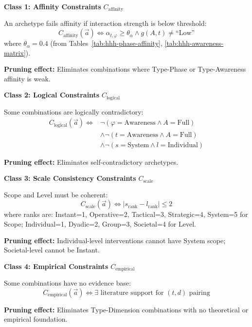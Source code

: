 \begin{tcolorbox}[colback=gray!5!white, colframe=gray!75!black,
    title=Definition HHH-D3: Four Constraint Classes]

\textbf{Class 1: Affinity Constraints} $C_{\text{affinity}}$

An archetype fails affinity if interaction strength is below threshold:
\begin{equation}
C_{\text{affinity}}(\vec{a}) \iff \alpha_{t,\varphi} \geq \theta_\alpha \wedge g(A, t) \neq \text{``Low''}
\end{equation}
where $\theta_\alpha = 0.4$ (from Tables~\ref{tab:hhh-phase-affinity}, \ref{tab:hhh-awareness-matrix}).

\textbf{Pruning effect:} Eliminates combinations where Type-Phase or Type-Awareness affinity is weak.

\medskip
\textbf{Class 2: Logical Constraints} $C_{\text{logical}}$

Some combinations are logically contradictory:
\begin{align}
C_{\text{logical}}(\vec{a}) \iff &\neg(\varphi = \text{Awareness} \wedge A = \text{Full}) \tag{Redundancy} \\
&\wedge \neg(t = \text{Awareness} \wedge A = \text{Full}) \tag{Type-Awareness} \\
&\wedge \neg(s = \text{System} \wedge l = \text{Individual}) \tag{Scale mismatch}
\end{align}

\textbf{Pruning effect:} Eliminates self-contradictory archetypes.

\medskip
\textbf{Class 3: Scale Consistency Constraints} $C_{\text{scale}}$

Scope and Level must be coherent:
\begin{equation}
C_{\text{scale}}(\vec{a}) \iff |s_{\text{rank}} - l_{\text{rank}}| \leq 2
\end{equation}
where ranks are: Instant=1, Operative=2, Tactical=3, Strategic=4, System=5 for Scope; Individual=1, Dyadic=2, Group=3, Societal=4 for Level.

\textbf{Pruning effect:} Individual-level interventions cannot have System scope; Societal-level cannot be Instant.

\medskip
\textbf{Class 4: Empirical Constraints} $C_{\text{empirical}}$

Some combinations have no evidence base:
\begin{equation}
C_{\text{empirical}}(\vec{a}) \iff \exists \text{ literature support for } (t, d) \text{ pairing}
\end{equation}

\textbf{Pruning effect:} Eliminates Type-Dimension combinations with no theoretical or empirical foundation.

\end{tcolorbox}

